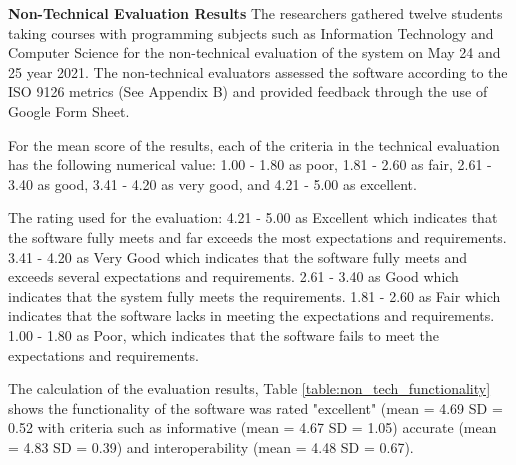 \textbf{Non-Technical Evaluation Results}
\justifying
\parx
The researchers gathered twelve students taking courses with programming
subjects such as Information Technology and Computer Science for the non-technical
evaluation of the system on May 24 and 25 year 2021. The non-technical evaluators
assessed the software according to the ISO 9126 metrics (See Appendix B) and
provided feedback through the use of Google Form Sheet.

\parx
For the mean score of the results, each of the criteria in the technical
evaluation has the following numerical value: 1.00 - 1.80 as poor, 1.81 - 2.60 as fair, 2.61 - 3.40 as good,
3.41 - 4.20 as very good, and 4.21 - 5.00 as excellent.

\parx
The rating used for the evaluation: 4.21 - 5.00 as Excellent which indicates that the
software fully meets and far exceeds the most expectations and requirements.
3.41 - 4.20 as Very Good which indicates that the software fully meets and exceeds
several expectations and requirements. 2.61 - 3.40 as Good which indicates that the
system fully meets the requirements. 1.81 - 2.60 as Fair which indicates that the software
lacks in meeting the expectations and requirements. 1.00 - 1.80 as Poor, which
indicates that the software fails to meet the expectations and requirements.

\parx
The calculation of the evaluation results, Table \ref{table:non_tech_functionality} shows the
functionality of the software was rated "excellent" (mean = 4.69 SD = 0.52 with criteria
such as informative (mean = 4.67 SD = 1.05) accurate (mean = 4.83 SD = 0.39)
and interoperability (mean = 4.48 SD = 0.67).

